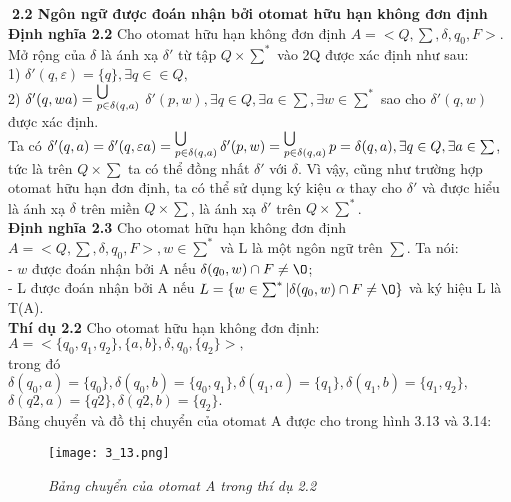 \begin{flushleft}
\textbf{2.2 Ngôn ngữ được đoán nhận bởi otomat hữu hạn không đơn định}\\
\textbf{Định nghĩa 2.2} Cho otomat hữu hạn không đơn định $A = <Q, \sum, \delta, q_0, F>$. Mở rộng của $\delta$ là ánh xạ $\delta'$ từ tập $Q \times \sum^*$ vào 2Q được xác định như sau:\\
1) $\delta'(q, \varepsilon) = \{q\}, \exists q \in \in Q,$\\
2) $\delta'(q, wa) = \operatorname*{}_{p \in \delta(q,a)}^{\bigcup}$ $\delta ' ( p, w ) , \exists q\in Q, \exists a \in \sum, \exists w \in \sum^*$ sao cho $\delta'(q, w)$ được xác định.\\
Ta có $\delta'(q, a) = \delta'(q , \varepsilon a) = \operatorname*{}_{p \in \delta(q,a)}^{\bigcup} \delta ' ( p, w ) = \operatorname*{}_{p \in \delta(q,a)}^{\bigcup} p = \delta(q,a), \exists q \in Q, \exists a \in \sum$, tức là trên $Q \times \sum$ ta có thể đồng nhất $\delta'$ với $\delta$. Vì vậy, cũng như trường hợp otomat hữu hạn đơn định, ta có thể sử dụng ký kiệu $\alpha$ thay cho $\delta'$ và được hiểu là ánh xạ $\delta$ trên miền $Q \times \sum$, là ánh xạ $\delta'$ trên $Q \times \sum^*$.\\
\textbf{Định nghĩa 2.3} Cho otomat hữu hạn không đơn định $A = <Q, \sum, \delta, q_0, F>, w \in \sum^*$ và L là một ngôn ngữ trên $\sum$. Ta nói:\\
- $w$ được đoán nhận bởi A nếu $\delta(q_0, w) \cap F \ne \O$;\\
- L được đoán nhận bởi A nếu $L = \{w \in \sum^* | \delta(q_0, w) \cap F \ne \O\}$ và ký hiệu L là T(A). \\
\textbf{Thí dụ 2.2} Cho otomat hữu hạn không đơn định:\\
$A = <\{q_0, q_1, q_2\}, \{a, b\}, \delta, q_0, \{q_2\}>,$\\
trong đó $\delta(q_0, a) = \{q_0\}, \delta(q_0, b) = \{q_0, q_1\}, \delta(q_1, a) = \{q_1\}, \delta(q_1, b) = \{q_1, q_2\},$\\
\hspace{10mm}$\delta(q2, a) = \{q2\}, \delta(q2, b) = \{q_2\}.$\\
Bảng chuyển và đồ thị chuyển của otomat A được cho trong hình 3.13 và 3.14:\\
\begin{figure}[ht]
\texttt{[image: 3\_13.png]}
\caption{ \textit{Bảng chuyển của otomat A trong thí dụ 2.2}}
\end{figure}


\end{flushleft}
